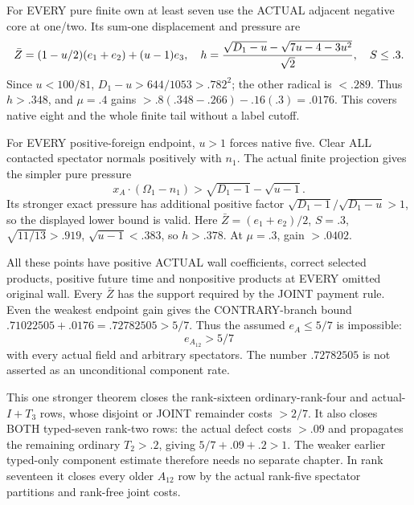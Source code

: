 For EVERY pure finite own at least seven use
the ACTUAL adjacent negative core at one/two.
Its sum-one displacement and pressure are
\[
 \bar Z=(1-u/2)(e_1+e_2)+(u-1)e_3,\quad
 h={\sqrt{D_1-u}-\sqrt{7u-4-3u^2}\over\sqrt2},
 \quad S\le.3 .
\]
Since \(u<100/81\),
\(D_1-u>644/1053>.782^2\);
the other radical is \(<.289\).
Thus \(h>.348\), and \(\mu=.4\) gains
\(>.8(.348-.266)-.16(.3)=.0176\).
This covers native eight and the whole finite
tail without a label cutoff.

For EVERY positive-foreign endpoint, \(u>1\)
forces native five.
Clear ALL contacted spectator normals positively
with \(n_1\).
The actual finite projection gives the simpler
pure pressure
\[
 x_A\cdot(\Omega_1-n_1)>
                  \sqrt{D_1-1}-\sqrt{u-1}.
\]
Its stronger exact pressure has additional
positive factor
\(\sqrt{D_1-1}/\sqrt{D_1-u}>1\), so the
displayed lower bound is valid.
Here \(\bar Z=(e_1+e_2)/2\), \(S=.3\),
\(\sqrt{11/13}>.919\), \(\sqrt{u-1}<.383\),
so \(h>.378\).
At \(\mu=.3\), gain \(>.0402\).

All these points have positive ACTUAL wall
coefficients, correct selected products, positive
future time and nonpositive products at EVERY
omitted original wall.
Every \(\bar Z\) has the support required
by the JOINT payment rule.
Even the weakest endpoint gain gives the
CONTRARY-branch bound
\(.71022505+.0176=.72782505>5/7\).
Thus the assumed \(e_A\le5/7\) is impossible:
\[
                                  e_{A_{12}}>5/7
\tag{A12U}\label{eq:arithA12universal}
\]
with every actual field and arbitrary spectators.
The number \(.72782505\) is not asserted
as an unconditional component rate.

This one stronger theorem closes the rank-sixteen
ordinary-rank-four and actual-\(I+T_3\) rows,
whose disjoint or JOINT remainder costs \(>2/7\).
It also closes BOTH typed-seven rank-two rows:
the actual defect costs \(>.09\) and propagates
the remaining ordinary \(T_2>.2\), giving
\(5/7+.09+.2>1\).
The weaker earlier typed-only component estimate
therefore needs no separate chapter.
In rank seventeen it closes every older
\(A_{12}\) row by the actual rank-five spectator
partitions and rank-free joint costs.

































